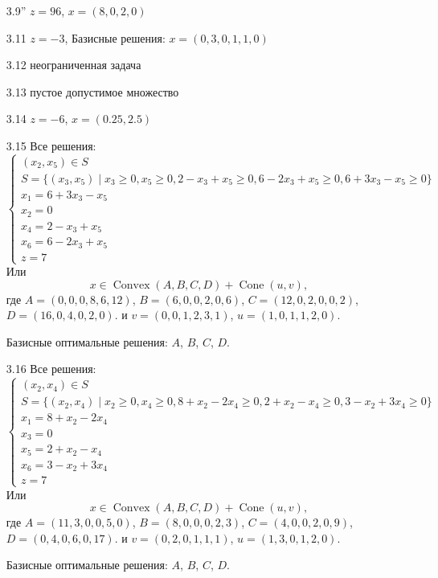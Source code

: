 \documentclass[12pt]{article}
\DeclareMathOperator{\Convex}{Convex}
\DeclareMathOperator{\cone}{Cone}
\begin{document}
\begin{enumerate}
  \item[3.9''] $z = 96$, $x = (8, 0, 2, 0)$
  
  \item[3.11] $z = -3$, Базисные решения: $x = (0, 3, 0, 1, 1, 0)$

  \item[3.12] неограниченная задача
  
  \item[3.13] пустое допустимое множество
  
  \item[3.14] $z=-6$, $x = (0.25, 2.5)$

  \item[3.15] Все решения:
  \[
  \begin{cases}
    (x_2, x_5) \in S\\
    S = \{ (x_3, x_5) \mid x_3 \geq 0, x_5 \geq 0, 2 - x_3 + x_5 \geq 0, 6 - 2x_3 + x_5 \geq 0, 6+3x_3-x_5\geq 0 \} \\
    x_1 = 6 + 3x_3 - x_5\\
    x_2 = 0 \\
    x_4 = 2 - x_3 + x_5 \\ 
    x_6 = 6 - 2x_3 + x_5 \\
    z = 7
  \end{cases} 
  \]
  Или
  \[
  x \in \Convex(A, B, C, D)  + \cone(u, v),
  \]
  где $A = (0, 0, 0, 8, 6, 12)$, $B = (6, 0, 0, 2, 0, 6)$, $C = (12, 0, 2, 0, 0, 2)$, $D = (16, 0, 4, 0, 2, 0)$. 
  и $v = (0, 0, 1, 2, 3, 1)$, $u = (1, 0, 1, 1, 2, 0)$.

  Базисные оптимальные решения: $A$, $B$, $C$, $D$.

  \item[3.16] Все решения:
  \[
  \begin{cases}
    (x_2, x_4) \in S\\
    S = \{ (x_2, x_4) \mid x_2 \geq 0, x_4 \geq 0, 8 + x_2 - 2x_4 \geq 0, 2 + x_2 - x_4 \geq 0, 3 - x_2 + 3x_4 \geq 0 \} \\
    x_1 = 8 + x_2 - 2x_4\\
    x_3 = 0 \\
    x_5 = 2 + x_2 - x_4 \\ 
    x_6 = 3 - x_2 + 3x_4 \\
    z = 7
  \end{cases} 
  \]
  Или
  \[
  x \in \Convex(A, B, C, D)  + \cone(u, v),
  \]
  где $A = (11, 3, 0, 0, 5, 0)$, $B = (8, 0, 0, 0, 2, 3)$, $C = (4, 0, 0, 2, 0, 9)$, $D = (0, 4, 0, 6, 0, 17)$. 
  и $v = (0, 2, 0, 1, 1, 1)$, $u = (1, 3, 0, 1, 2, 0)$.

  Базисные оптимальные решения: $A$, $B$, $C$, $D$.

\end{enumerate}
\end{document}
